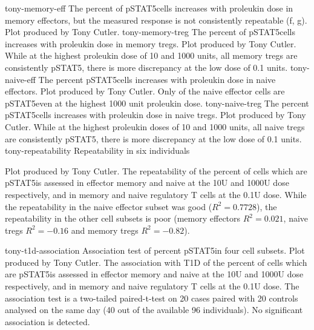 {tony-memory-eff}
{ The percent of pSTAT5\positive cells increases with proleukin dose in memory effectors,
but the measured response is not consistently repeatable (f, g). }
{
  Plot produced by Tony Cutler.
}
{tony-memory-treg}
{ The percent of pSTAT5\positive cells increases with proleukin dose in memory tregs. }
{
  Plot produced by Tony Cutler.
  While at the highest proleukin dose of 10 and 1000 units, all memory tregs are consistently pSTAT5\positive,
  there is more discrepancy at the low dose of 0.1 units.
}
{tony-naive-eff}
{ The percent pSTAT5\positive cells increases with proleukin dose in naive effectors. }
{
  Plot produced by Tony Cutler.
  Only  of the naive effector cells are pSTAT5\positive even at the highest 1000 unit proleukin dose.
}
{tony-naive-treg}
{ The percent pSTAT5\positive cells increases with proleukin dose in naive tregs. }
{
  Plot produced by Tony Cutler.
  While at the highest proleukin doses of 10 and 1000 units, all naive tregs are consistently pSTAT5\positive,
  there is more discrepancy at the low dose of 0.1 units.
}
{tony-repeatability}
{ Repeatability in six individuals }
{
  Plot produced by Tony Cutler.
  The repeatability of the percent of cells which are pSTAT5\positive is assessed in effector memory and naive at the 10U and 1000U dose
  respectively, and in memory and naive regulatory T cells at the 0.1U dose.
  While the repeatability in the naive effector subset was good ($R^2=0.7728$), the repeatability in the other cell subsets is poor
  (memory effectors $R^2=0.021$, naive tregs $R^2=-0.16$ and memory tregs $R^2=-0.82$).

}
{tony-t1d-association}
{ Association test of percent pSTAT5\positive in four cell subsets. }
{
  Plot produced by Tony Cutler.
  The association with T1D of the percent of cells which are pSTAT5\positive is assessed in effector memory and naive at the 10U and 1000U dose
  respectively, and in memory and naive regulatory T cells at the 0.1U dose.
  The association test is a two-tailed paired-t-test on 20 cases paired with 20 controls analysed on the same day (40 out of the available 96 individuals).
  No significant association is detected.
}

